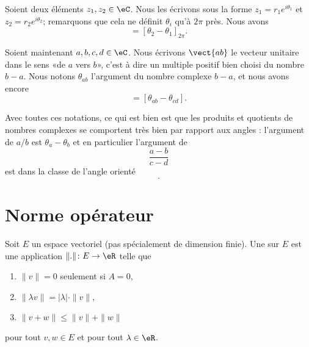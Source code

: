 Soient deux éléments \( z_1,z_2\in \eC\). Nous les écrivons sous la forme \( z_1=r_1 e^{i\theta_1}\) et \( z_2=r_2 e^{i\theta_2}\); remarquons que cela ne définit \( \theta_i\) qu'à \( 2\pi\) près. Nous avons
\begin{equation}
    [z_1,z_2]=[\theta_2-\theta_1]_{2\pi}.
\end{equation}

Soient maintenant \( a,b,c,d\in \eC\). Nous écrivons \( \vect{ ab }\) le vecteur unitaire dans le sens «de \( a\) vers \( b\)», c'est à dire un multiple positif bien choisi du nombre \( b-a\). Nous notons \( \theta_{ab}\) l'argument du nombre complexe \( b-a\), et nous avons encore
\begin{equation}
    [\vect{ ab },\vect{ cd }]=[\theta_{ab}-\theta_{cd}].
\end{equation}

Avec toutes ces notations, ce qui est bien est que les produits et quotients de nombres complexes se comportent très bien par rapport aux angles : l'argument de \( a/b\) est \( \theta_a-\theta_b\) et en particulier l'argument de 
\begin{equation}
    \frac{ a-b }{ c-d }
\end{equation}
est dans la classe de l'angle orienté
\begin{equation}
    [\vect{ ba },\vect{ dc }].
\end{equation}

\section{Norme opérateur}
\label{SeckwyQjK}

\begin{definition}  \label{DefOYPooZIoWnI}
    Soit \( E\) un espace vectoriel (pas spécialement de dimension finie). Une   sur $E$ est une application $\| . \|\colon E\to \eR$ telle que
    \begin{enumerate}
        \item
            $\| v \|=0$ seulement si $A=0$,
        \item
            $\| \lambda v \|=| \lambda |\cdot\| v \|$,
        \item
            $\| v+w \|\leq\| v \|+\| w \|$

    \end{enumerate}
    pour tout $v,w\in E$ et pour tout $\lambda\in\eR$.
\end{definition}

